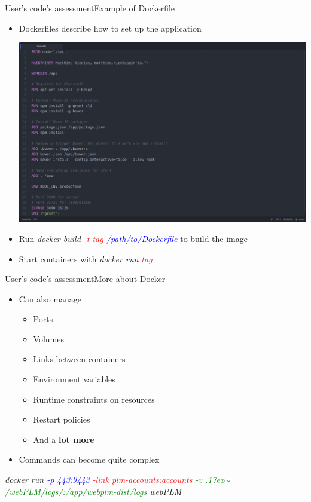 \documentclass{beamer}
\begin{document}
\begin{frame}{User's code's assessment}{Example of Dockerfile}
  \begin{itemize}
  \item {
    Dockerfiles describe how to set up the application
  }
  \begin{center}
    \includegraphics[scale=0.12]{img/dockerfile.png}
  \end{center}
  \item {
    Run \emph{docker build \textcolor{red}{-t tag} \textcolor{blue}{/path/to/Dockerfile}} to build  the image
  }
  \item {
    Start containers with \emph{docker run \textcolor{red}{tag}}
  }
  \end{itemize}
\end{frame}

\begin{frame}{User's code's assessment}{More about Docker}
  \begin{itemize}
  \item {
    Can also manage
    \begin{itemize}
    \item {
      Ports
      \pause
    }
    \item {
      Volumes
      \pause
    }
    \item {
      Links between containers
      \pause
    }
    \item {
      Environment variables
    }
    \item {
      Runtime constraints on resources
    }
    \item {
      Restart policies
    }
    \item {
      And a \textbf{lot more}
      \pause
    }
    \end{itemize}
  }
  \item {
    Commands can become quite complex
  }
  \end{itemize}
  \begin{center} {
    \emph{docker run \textcolor{blue}{-p 443:9443} \textcolor{red}{-link plm-accounts:accounts} \textcolor{green}{-v \raise.17ex\hbox{$\scriptstyle\sim$}/webPLM/logs/:/app/webplm-dist/logs} webPLM}
  }
  \end{center}
\end{frame}
\end{document}

